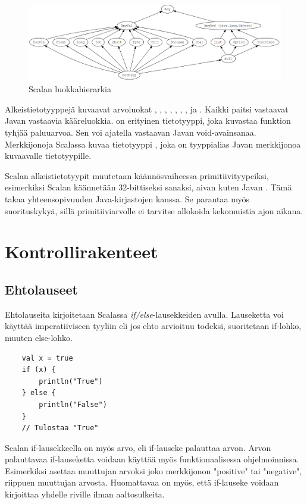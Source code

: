 \begin{figure}
    \centering \includegraphics[width=1\textwidth]{kuvat/typehierarchy}
    \caption{Scalan luokkahierarkia}
    \label{tyyppihierarkia}
\end{figure}

Alkeistietotyyppejä kuvaavat arvoluokat , , , , , , ,  ja . Kaikki paitsi  vastaavat Javan vastaavia kääreluokkia.  on erityinen tietotyyppi, joka kuvastaa funktion tyhjää paluuarvoa. Sen voi ajatella vastaavan Javan void-avainsanaa. Merkkijonoja Scalassa kuvaa tietotyyppi , joka on tyyppialias Javan merkkijonoa kuvaavalle tietotyypille.
\cite[Luku 5]{prorgrammingInScala3rd}

Scalan alkeistietotyypit muutetaan käännösvaiheessa primitiivityypeiksi, esimerkiksi Scalan  käännetään 32-bittiseksi sanaksi, aivan kuten Javan . Tämä takaa yhteensopivuuden Java-kirjastojen kanssa. Se parantaa myös suorituskykyä, sillä primitiiviarvolle ei tarvitse allokoida kekomuistia ajon aikana.
\cite[Luku 6]{prorgrammingInScala3rd}


\section{Kontrollirakenteet}

\subsection{Ehtolauseet}
Ehtolauseita kirjoitetaan Scalassa \textit{if/else}-lausekkeiden avulla. Lauseketta voi käyttää imperatiiviseen tyyliin eli jos ehto arvioituu todeksi, suoritetaan if-lohko, muuten else-lohko.
\begin{lstlisting}
    val x = true
    if (x) {
        println("True")
    } else {
        println("False")
    }
    // Tulostaa "True"
\end{lstlisting}
Scalan if-lausekkeella on myös arvo, eli if-lauseke palauttaa arvon. Arvon palauttavaa if-lauseketta voidaan käyttää myös funktionaalisessa ohjelmoinnissa. Esimerkiksi  asettaa muuttujan  arvoksi joko merkkijonon "positive" tai "negative", riippuen muuttujan  arvosta. Huomattavaa on myös, että if-lauseke voidaan kirjoittaa yhdelle riville ilman aaltosulkeita. 
\cite[Luku 2.1]{scalaForTheImpatient}
        

